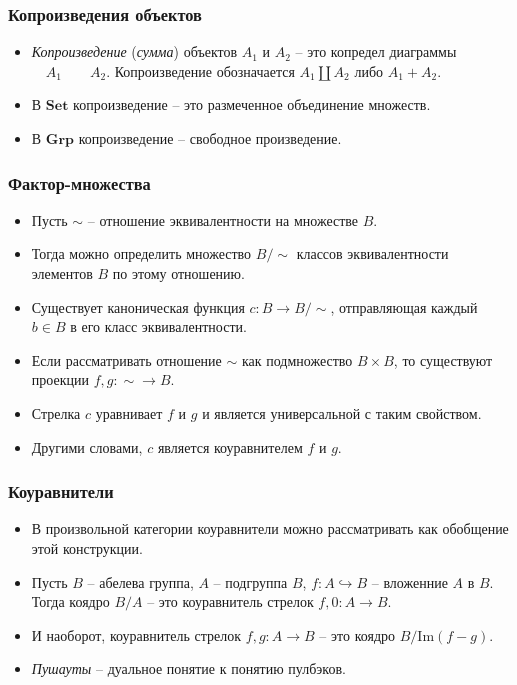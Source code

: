 \documentclass{beamer}
\theoremstyle{definition}
\newcommand{\cat}[1]{\mathbf{#1}}
\newcommand{\Set}{\cat{Set}}
\newcommand{\Grp}{\cat{Grp}}
\newcommand{\im}{\mathrm{Im}}
\begin{document}
\begin{frame}
\frametitle{Копроизведения объектов}
\begin{itemize}
\item \emph{Копроизведение} (\emph{сумма}) объектов $A_1$ и $A_2$ -- это копредел диаграммы $\quad A_1 \qquad A_2$. Копроизведение обозначается $A_1 \amalg A_2$ либо $A_1 + A_2$.
\item В $\Set$ копроизведение -- это размеченное объединение множеств.
\item В $\Grp$ копроизведение -- свободное произведение.
\end{itemize}
\end{frame}

\begin{frame}
\frametitle{Фактор-множества}
\begin{itemize}
\item Пусть $\sim$ -- отношение эквивалентности на множестве $B$.
\item Тогда можно определить множество $B / \sim$ классов эквивалентности элементов $B$ по этому отношению.
\item Существует каноническая функция $c : B \to B / \sim$, отправляющая каждый $b \in B$ в его класс эквивалентности.
\item Если рассматривать отношение $\sim$ как подмножество $B \times B$, то существуют проекции $f, g : \sim \to B$.
\item Стрелка $c$ уравнивает $f$ и $g$ и является универсальной с таким свойством.
\item Другими словами, $c$ является коуравнителем $f$ и $g$.
\end{itemize}
\end{frame}

\begin{frame}
\frametitle{Коуравнители}
\begin{itemize}
\item В произвольной категории коуравнители можно рассматривать как обобщение этой конструкции.
\item Пусть $B$ -- абелева группа, $A$ -- подгруппа $B$, $f : A \hookrightarrow B$ -- вложенние $A$ в $B$.
Тогда коядро $B/A$ -- это коуравнитель стрелок $f,0 : A \to B$.
\item И наоборот, коуравнитель стрелок $f,g : A \to B$ -- это коядро $B/\im(f-g)$.
\item \emph{Пушауты} -- дуальное понятие к понятию пулбэков.
\end{itemize}
\end{frame}
\end{document}
